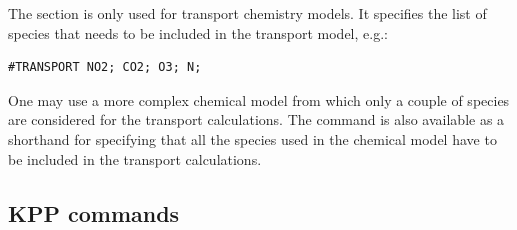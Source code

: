\documentclass[twoside]{article}
\begin{document}
The  section is only used for transport chemistry
models. It specifies the list of species that needs to be included in
the transport model, e.g.:
%
\begin{verbatim}
#TRANSPORT NO2; CO2; O3; N;
\end{verbatim}
%
One may use a more complex chemical model from which only a couple of
species are considered for the transport calculations. The
 command is also available as a shorthand for
specifying that all the species used in the chemical model have to be
included in the transport calculations.

\subsection{KPP commands}
\end{document}

